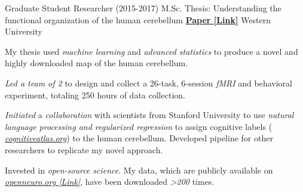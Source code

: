 \begin{cventries}
  \cventry
    {Graduate Student Researcher (2015-2017)} %
    {M.Sc. Thesis: Understanding the functional organization of the human cerebellum}
    {\href{http://ivrylab.berkeley.edu/uploads/4/1/1/5/41152143/functional_boundaries_in_the_human_cerebellum.pdf}{\textbf{Paper [Link]}}}
    {Western University} %
    {
      \begin{cvitems} %
        \item {My thesis used \textit{machine learning} and \textit{advanced statistics} to produce a novel and highly downloaded map of the human cerebellum.}
      	\item {\textit{Led a team of 2} to design and collect a 26-task, 6-session \textit{fMRI} and behavioral experiment, totaling 250 hours of data collection.}
      	\item {\textit{Initiated} a \textit{collaboration} with scientists from Stanford University to use \textit{natural language processing and regularized regression} to assign cognitive labels ( {\href{https://cognitiveatlas.org/}{\textit{cognitiveatlas.org}}}) to the human cerebellum. Developed pipeline for other researchers to replicate my novel approach.}
      	\item {Invested in \textit{open-source science}. My data, which are publicly available on {\href{https://openneuro.org/datasets/ds002105/versions/1.1.0}{\textit{openneuro.org [Link]}}}, have been downloaded \textit{>200} times.}
      \end{cvitems}
    }

\end{cventries}
